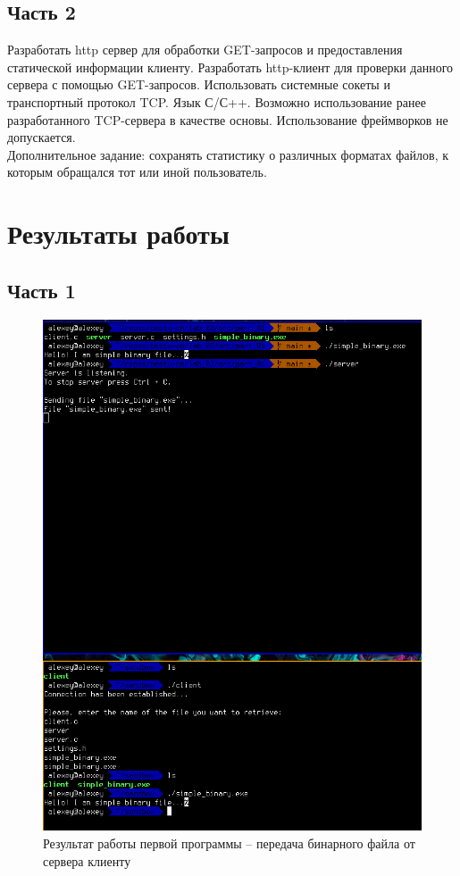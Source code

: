 \documentclass[12pt]{report}
\begin{document}
\subsection*{Часть 2}

Разработать http сервер для обработки GET-запросов и предоставления статической информации клиенту. Разработать http-клиент для проверки данного сервера с помощью GET-запросов. Использовать системные сокеты и транспортный протокол TCP. Язык С/С++. Возможно использование ранее разработанного TCP-сервера в качестве основы. Использование фреймворков не допускается.
\\

Дополнительное задание: сохранять статистику о различных форматах файлов, к которым обращался тот или иной пользователь.

\section*{Результаты работы}

\subsection*{Часть 1}

\begin{figure}[H]
	\begin{center}
		\includegraphics[scale=0.6]{img/prog_01.png}
	\end{center}
	\caption{Результат работы первой программы -- передача бинарного файла от сервера клиенту}
	\label{fig:prog_01}
\end{figure}
\end{document}
